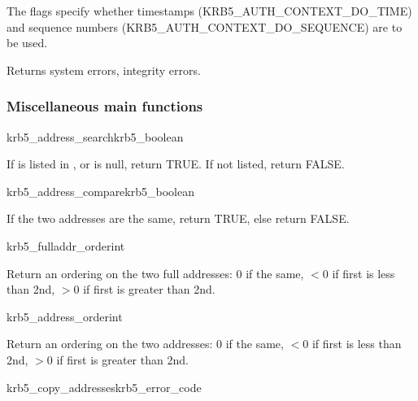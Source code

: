 The  flags specify whether timestamps
(KRB5_AUTH_CONTEXT_DO_TIME) and sequence numbers
(KRB5_AUTH_CONTEXT_DO_SEQUENCE) are to be used.

Returns system errors, integrity errors.

\subsubsection{Miscellaneous main functions}

\begin{funcdecl}{krb5_address_search}{krb5_boolean}{\funcinout}
\funcin
{}
\end{funcdecl}

If  is listed in , or
 is null, return TRUE.  If not listed, return FALSE.

\begin{funcdecl}{krb5_address_compare}{krb5_boolean}{\funcinout}
\funcin
{}
\end{funcdecl}

If the two addresses are the same, return TRUE, else return FALSE.

\begin{funcdecl}{krb5_fulladdr_order}{int}{\funcinout}
\funcin
{}
\end{funcdecl}

Return an ordering on the two full addresses:  0 if the same,
$< 0$ if first is less than 2nd, $> 0$ if first is greater than 2nd.

\begin{funcdecl}{krb5_address_order}{int}{\funcinout}
\funcin
{}
\end{funcdecl}

Return an ordering on the two addresses:  0 if the same,
$< 0$ if first is less than 2nd, $> 0$ if first is greater than 2nd.

\begin{funcdecl}{krb5_copy_addresses}{krb5_error_code}{\funcinout}
\funcin
{}
\funcout
{}
\end{funcdecl}

